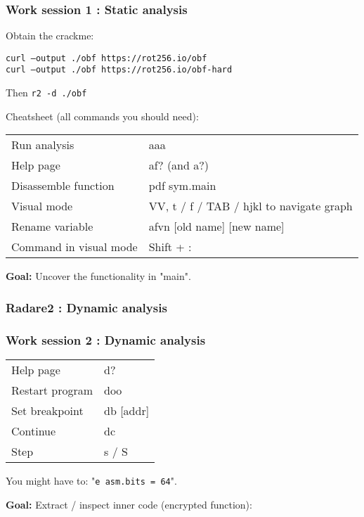 \documentclass{beamer}
\begin{document}
\begin{frame}
\frametitle{Work session 1 : Static analysis}
Obtain the crackme: \\

\vspace{3mm}

\texttt{curl --output ./obf https://rot256.io/obf} \\
\texttt{curl --output ./obf https://rot256.io/obf-hard}

\vspace{3mm}

Then \texttt{r2 -d ./obf}

\vspace{3mm}

Cheatsheet (all commands you should need):

\vspace{3mm}

\begin{tabular}{l | l}
    Run analysis         & aaa \\
    Help page            & af? (and a?) \\
    Disassemble function & pdf sym.main \\
    Visual mode          & VV, t / f / TAB / hjkl to navigate graph \\
    Rename variable      & afvn [old name] [new name] \\
    Command in visual mode & Shift + :
\end{tabular}

\vspace{3mm}

\textbf{Goal:} Uncover the functionality in "main".

\end{frame}

\begin{frame}
\frametitle{Radare2 : Dynamic analysis}
\end{frame}

\begin{frame}
\frametitle{Work session 2 : Dynamic analysis}

\vspace{3mm}

\begin{tabular}{l | l}
    Help page        & d? \\
    Restart program  & doo \\
    Set breakpoint   & db [addr] \\
    Continue         & dc \\
    Step             & s / S \\
\end{tabular}

\vspace{3mm}

You might have to: "\texttt{e asm.bits = 64}". \\

\vspace{3mm}

\textbf{Goal:} Extract / inspect inner code (encrypted function):
\end{frame}
\end{document}
